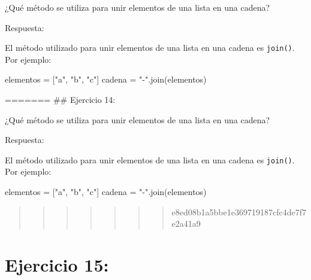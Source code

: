 \documentclass[
  a4paper,
  DIV=11,
  numbers=noendperiod,
  onepage,
  openany]{scrreprt}
\newenvironment{Shaded}{\begin{snugshade}}{\end{snugshade}}
\newcommand{\NormalTok}[1]{\textcolor[rgb]{0.00,0.23,0.31}{#1}}
\newcommand{\OperatorTok}[1]{\textcolor[rgb]{0.37,0.37,0.37}{#1}}
\newcommand{\StringTok}[1]{\textcolor[rgb]{0.13,0.47,0.30}{#1}}
\begin{document}
¿Qué método se utiliza para unir elementos de una lista en una cadena?

Respuesta:

El método utilizado para unir elementos de una lista en una cadena es
\texttt{join()}. Por ejemplo:

\begin{Shaded}
\begin{Highlighting}[]
\NormalTok{elementos }\OperatorTok{=}\NormalTok{ [}\StringTok{"a"}\NormalTok{, }\StringTok{"b"}\NormalTok{, }\StringTok{"c"}\NormalTok{]}
\NormalTok{cadena }\OperatorTok{=} \StringTok{"{-}"}\NormalTok{.join(elementos)}
\end{Highlighting}
\end{Shaded}

======= \#\# Ejercicio 14:

¿Qué método se utiliza para unir elementos de una lista en una cadena?

Respuesta:

El método utilizado para unir elementos de una lista en una cadena es
\texttt{join()}. Por ejemplo:

\begin{Shaded}
\begin{Highlighting}[]
\NormalTok{elementos }\OperatorTok{=}\NormalTok{ [}\StringTok{"a"}\NormalTok{, }\StringTok{"b"}\NormalTok{, }\StringTok{"c"}\NormalTok{]}
\NormalTok{cadena }\OperatorTok{=} \StringTok{"{-}"}\NormalTok{.join(elementos)}
\end{Highlighting}
\end{Shaded}

\begin{quote}
\begin{quote}
\begin{quote}
\begin{quote}
\begin{quote}
\begin{quote}
\begin{quote}
e8ed08b1a5bbe1e369719187cfc4de7f7e2a41a9
\end{quote}
\end{quote}
\end{quote}
\end{quote}
\end{quote}
\end{quote}
\end{quote}

\hypertarget{ejercicio-15}{%
\chapter{Ejercicio 15:}\label{ejercicio-15}}
\end{document}
